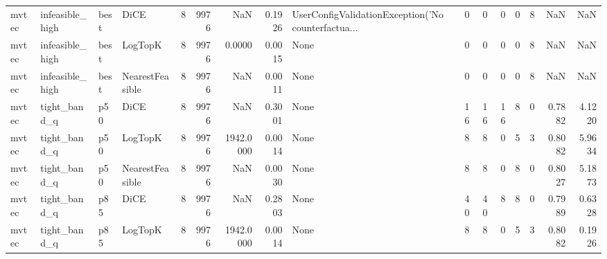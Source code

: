 \begin{tabular}{llllrrrrlrrrrrrr}
  mvtec &      infeasible\_high &   best &            DiCE &            8 &                 9976 &                      NaN &      0.1926 & UserConfigValidationException('No counterfactua... &      0 &            0 &        0 &              0 &          8 &                NaN &            NaN \\
  mvtec &      infeasible\_high &   best &         LogTopK &            8 &                 9976 &                   0.0000 &      0.0015 &                                               None &      0 &            0 &        0 &              0 &          8 &                NaN &            NaN \\
  mvtec &      infeasible\_high &   best & NearestFeasible &            8 &                 9976 &                      NaN &      0.0011 &                                               None &      0 &            0 &        0 &              0 &          8 &                NaN &            NaN \\
  mvtec &         tight\_band\_q &    p50 &            DiCE &            8 &                 9976 &                      NaN &      0.3001 &                                               None &     16 &           16 &       16 &              8 &          0 &             0.7882 &         4.1220 \\
  mvtec &         tight\_band\_q &    p50 &         LogTopK &            8 &                 9976 &                1942.0000 &      0.0014 &                                               None &      8 &            8 &        0 &              5 &          3 &             0.8082 &         5.9634 \\
  mvtec &         tight\_band\_q &    p50 & NearestFeasible &            8 &                 9976 &                      NaN &      0.0030 &                                               None &      8 &            8 &        0 &              8 &          0 &             0.8027 &         5.1873 \\
  mvtec &         tight\_band\_q &    p85 &            DiCE &            8 &                 9976 &                      NaN &      0.2803 &                                               None &     40 &           40 &        8 &              8 &          0 &             0.7989 &         0.6328 \\
  mvtec &         tight\_band\_q &    p85 &         LogTopK &            8 &                 9976 &                1942.0000 &      0.0014 &                                               None &      8 &            8 &        0 &              5 &          3 &             0.8082 &         0.1926 \\

\end{tabular}
